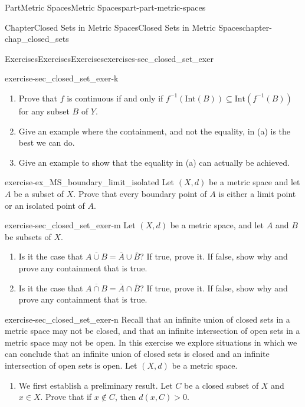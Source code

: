 \documentclass[oneside,10pt,]{book}
\numberwithin{equation}{chapter}
\newcommand{\Int}{\text{Int}}
\newcommand{\gt}{>}
\begin{document}
\begin{partptx}{Part}{Metric Spaces}{}{Metric Spaces}{}{}{part-part-metric-spaces}
\begin{chapterptx}{Chapter}{Closed Sets in Metric Spaces}{}{Closed Sets in Metric Spaces}{}{}{chapter-chap_closed_sets}
\begin{exercises-section}{Exercises}{Exercises}{}{Exercises}{}{}{exercises-sec_closed_set_exer}
\begin{divisionexercise}{11}{}{}{exercise-sec_closed_set_exer-k}
\begin{enumerate}[font=\bfseries,label=(\alph*),ref=\alph*]%
\item{}Prove that \(f\) is continuous if and only if \(f^{-1}(\Int(B)) \subseteq \Int(f^{-1}(B))\) for any subset \(B\) of \(Y\).%
\item{}Give an example where the containment, and not the equality, in (a) is the best we can do.%
\item{}Give an example to show that the equality in (a) can actually be achieved.%
\end{enumerate}%
\end{divisionexercise}%
\begin{divisionexercise}{12}{}{}{exercise-ex_MS_boundary_limit_isolated}%
Let \((X,d)\) be a metric space and let \(A\) be a subset of \(X\). Prove that every boundary point of \(A\) is either a limit point or an isolated point of \(A\).%
\end{divisionexercise}%
\begin{divisionexercise}{13}{}{}{exercise-sec_closed_set_exer-m}%
Let \((X,d)\) be a metric space, and let \(A\) and \(B\) be subsets of \(X\).%
\begin{enumerate}[font=\bfseries,label=(\alph*),ref=\alph*]%
\item{}Is it the case that \(\overline{A \cup B} = \overline{A} \cup \overline{B}\)? If true, prove it. If false, show why and prove any containment that is true.%
\item{}Is it the case that \(\overline{A \cap B} = \overline{A} \cap \overline{B}\)? If true, prove it. If false, show why and prove any containment that is true.%
\end{enumerate}%
\end{divisionexercise}%
\begin{divisionexercise}{14}{}{}{exercise-sec_closed_set_exer-n}%
Recall that an infinite union of closed sets in a metric space may not be closed, and that an infinite intersection of open sets in a metric space may not be open. In this exercise we explore situations in which we can conclude that an infinite union of closed sets is closed and an infinite intersection of open sets is open. Let \((X,d)\) be a metric space.%
\begin{enumerate}[font=\bfseries,label=(\alph*),ref=\alph*]%
\item{}We first establish a preliminary result. Let \(C\) be a closed subset of \(X\) and \(x \in X\). Prove that if \(x \notin C\), then \(d(x,C) \gt 0\).%

\end{enumerate}
\end{divisionexercise}
\end{exercises-section}
\end{chapterptx}
\end{partptx}
\end{document}
